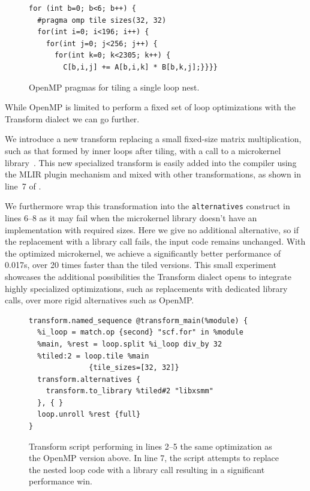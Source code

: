 \documentclass[screen,nonacm,authorversion]{acmart}
\begin{document}
\begin{figure}[t]
\centering
\begin{lstlisting}[style=OpenMP]
for (int b=0; b<6; b++) {
  #pragma omp tile sizes(32, 32)
  for(int i=0; i<196; i++) {
    for(int j=0; j<256; j++) {
      for(int k=0; k<2305; k++) {
        C[b,i,j] += A[b,i,k] * B[b,k,j];}}}}
\end{lstlisting}
\caption{OpenMP pragmas for tiling a single loop nest.}
\label{lst:openmp_program}
\end{figure}

While OpenMP is limited to perform a fixed set of loop optimizations with the Transform dialect we can go further.

We introduce a new transform replacing a small fixed-size matrix multiplication, such as that formed by inner loops after tiling, with a call to a microkernel library~\cite{libxsmm}.
This new specialized transform is easily added into the compiler using the MLIR plugin mechanism and mixed with other transformations, as shown in line~7 of .

We furthermore wrap this transformation into the \texttt{alternatives} construct in lines 6--8 as it may fail when the microkernel library doesn't have an implementation with required sizes.
Here we give no additional alternative, so if the replacement with a library call fails, the input code remains unchanged.
With the optimized microkernel, we achieve a significantly better performance of 0.017s, over 20 times faster than the tiled versions.%
This small experiment showcases the additional possibilities the Transform dialect opens to integrate highly specialized optimizations, such as replacements with dedicated library calls, over more rigid alternatives such as OpenMP.


\begin{figure}[t]
\centering
\begin{lstlisting}[style=transform]
transform.named_sequence @transform_main(%module) {
  %i_loop = match.op {second} "scf.for" in %module
  %main, %rest = loop.split %i_loop div_by 32
  %tiled:2 = loop.tile %main
              {tile_sizes=[32, 32]}
  transform.alternatives {
    transform.to_library %tiled#2 "libxsmm"
  }, { }
  loop.unroll %rest {full}
}
\end{lstlisting}
\caption{Transform script performing in lines 2--5 the same optimization as the OpenMP version above.
In line 7, the script attempts to replace the nested loop code with a library call resulting in a significant performance win.}
\label{lst:batchmatmul_transform_script}
\end{figure}
\end{document}
